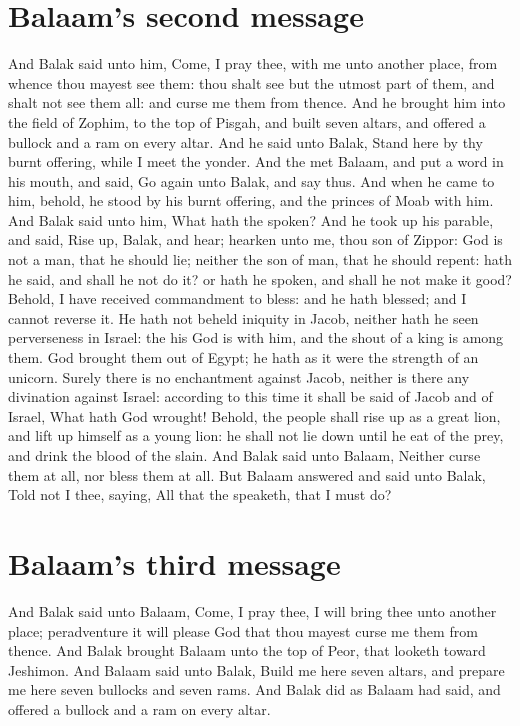 \begin{biblechapter}
\section*{Balaam's second message}
\verse And Balak said unto him, Come, I pray thee, with me unto another place, from whence thou mayest see them: thou shalt see but the utmost part of them, and shalt not see them all: and curse me them from thence.
\verse And he brought him into the field of Zophim, to the top of Pisgah, and built seven altars, and offered a bullock and a ram on every altar.
\verse And he said unto Balak, Stand here by thy burnt offering, while I meet the \LORD yonder.
\verse And the \LORD met Balaam, and put a word in his mouth, and said, Go again unto Balak, and say thus.
\verse And when he came to him, behold, he stood by his burnt offering, and the princes of Moab with him. And Balak said unto him, What hath the \LORD spoken?
\verse And he took up his parable, and said, Rise up, Balak, and hear; hearken unto me, thou son of Zippor:
\verse God is not a man, that he should lie; neither the son of man, that he should repent: hath he said, and shall he not do it? or hath he spoken, and shall he not make it good?
\verse Behold, I have received commandment to bless: and he hath blessed; and I cannot reverse it.
\verse He hath not beheld iniquity in Jacob, neither hath he seen perverseness in Israel: the \LORD his God is with him, and the shout of a king is among them.
\verse God brought them out of Egypt; he hath as it were the strength of an unicorn.
\verse Surely there is no enchantment against Jacob, neither is there any divination against Israel: according to this time it shall be said of Jacob and of Israel, What hath God wrought!
\verse Behold, the people shall rise up as a great lion, and lift up himself as a young lion: he shall not lie down until he eat of the prey, and drink the blood of the slain.
\verse And Balak said unto Balaam, Neither curse them at all, nor bless them at all.
\verse But Balaam answered and said unto Balak, Told not I thee, saying, All that the \LORD speaketh, that I must do?
\section*{Balaam's third message}
\verse And Balak said unto Balaam, Come, I pray thee, I will bring thee unto another place; peradventure it will please God that thou mayest curse me them from thence.
\verse And Balak brought Balaam unto the top of Peor, that looketh toward Jeshimon.
\verse And Balaam said unto Balak, Build me here seven altars, and prepare me here seven bullocks and seven rams.
\verse And Balak did as Balaam had said, and offered a bullock and a ram on every altar.
\end{biblechapter}

